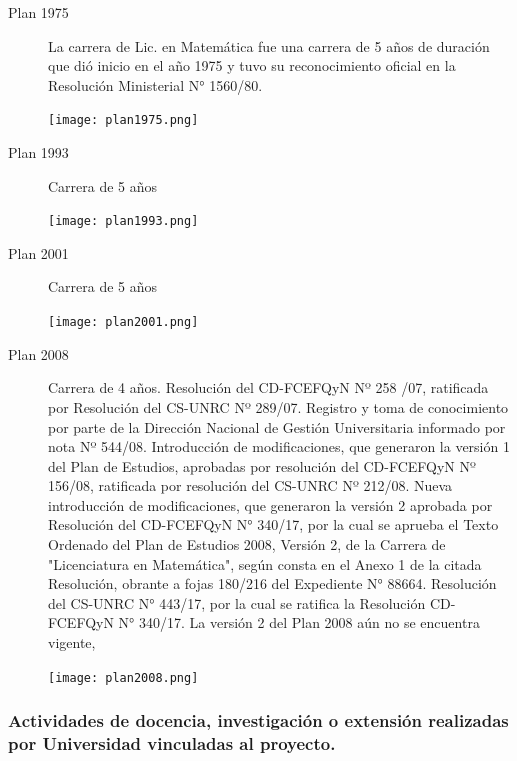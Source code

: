 \documentclass[a4paper, 12pt]{article}
\begin{document}
\begin{description}
 \item[Plan 1975] La carrera de Lic. en Matemática fue una carrera de 5 años de duración que dió inicio en el año 1975 y tuvo su reconocimiento oficial en la Resolución Ministerial N° 1560/80. 

 \texttt{[image: plan1975.png]}
 
\item[Plan 1993] Carrera de 5 años

 \texttt{[image: plan1993.png]}

\item[Plan 2001] Carrera de 5 años

 \texttt{[image: plan2001.png]}


\item[Plan 2008] Carrera de 4 años. Resolución del CD-FCEFQyN Nº 258 /07, ratificada 
por Resolución del CS-UNRC Nº 289/07. Registro y toma de conocimiento 
por parte de la Dirección Nacional de Gestión Universitaria informado por nota 
Nº 544/08. Introducción de modificaciones, que generaron la versión 1 del Plan 
de Estudios, aprobadas por resolución del CD-FCEFQyN Nº 156/08, 
ratificada por resolución del CS-UNRC Nº 212/08.  Nueva introducción de modificaciones, que generaron la versión 2 aprobada por Resolución del CD-FCEFQyN N° 340/17, por la cual se aprueba el Texto Ordenado del Plan de Estudios 2008, Versión 2, de la Carrera de "Licenciatura en Matemática", según consta en el Anexo 1 de la citada Resolución, obrante a fojas 180/216 del Expediente N° 88664.  Resolución del CS-UNRC N° 443/17, por la cual se ratifica la Resolución  CD-FCEFQyN N° 340/17.  La versión 2 del Plan 2008 aún no se encuentra vigente,

 \texttt{[image: plan2008.png]}

\end{description}




\subsubsection{Actividades de docencia, investigación o extensión realizadas por Universidad vinculadas  al proyecto.}
\end{document}
